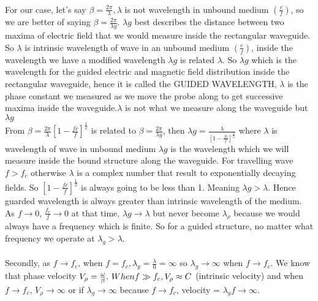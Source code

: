 	\paragraph{}For our case, let's say $\beta = \frac{2\pi}{\lambda}, \lambda$ is not wavelength in unbound medium $(\frac{c}{f})$, so we are better of saying  $\beta = \frac{2\pi}{\lambda g}$. ${\lambda g}$ best describes the distance between two maxima of electric field that we would measure inside the rectangular waveguide. So $\lambda$ is intrinsic wavelength of wave in an unbound medium $(\frac{c}{f})$, inside the wavelength we have a modified wavelength $\lambda g$ is related $\lambda$. So $\lambda g$ which is the wavelength for the guided electric and magnetic field distribution inside the rectangular waveguide, hence it is called the GUIDED WAVELENGTH, $\lambda$ is the phase constant we measured as we move the probe along to get successive maxima inside the waveguide.$\lambda$ is not what we measure along the waveguide but $\lambda g$\\
	From $\beta = \frac{2\pi}{\lambda}[1-{\frac{fc}{f}}]^{\frac{1}{2}}$ is related to  $\beta = \frac{2\pi}{\lambda g}$, then $\lambda g = \frac{\lambda}{[1-{\frac{fc}{f}}]^{\frac{1}{2}}}$ where $\lambda$ is wavelength of wave in unbound medium $\lambda g$ is the wavelength which we will measure inside the bound structure along the waveguide. For travelling wave $f>f_c$ otherwise $\lambda$ is a complex number that result to exponentially decaying fields. So $[1-{\frac{fc}{f}}]^{\frac{1}{2}}$ is always going to be less than 1. Meaning $\lambda g>\lambda$. Hence guarded wavelength is always greater than intrinsic wavelength of the medium. As $f\longrightarrow0$, $\frac{f_c}{f}\longrightarrow0$ at that time, $\lambda g\longrightarrow\lambda$ but never become $\lambda_\rho$ because we would always have a frequency which is finite. So for a guided structure, no matter what frequency we operate at $\lambda_g>\lambda$.
	\paragraph{}Secondly, as $f\longrightarrow f_c$, when $f=f_c, \lambda_g = \frac{\lambda}{0} = \infty$ so $\lambda_g\longrightarrow\infty$ when $f\longrightarrow f_c$. We know that phase velocity $V_\rho = \frac{\omega}{\beta}.\ When\\ f\gg f_c, V_\rho\approx C$ (intrinsic velocity) and when $f\longrightarrow f_c$, $V_\rho\longrightarrow\infty$ or if $\lambda_g\longrightarrow\infty$ because $f\longrightarrow f_c$, velocity = $\lambda_gf\longrightarrow\infty$.
